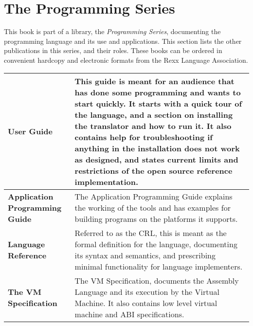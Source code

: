 \chapter{The \crexx{} Programming Series}
This book is part of a library, the \emph{\crexx{} Programming Series}, documenting the \crexx{} programming language and its use and applications. This section lists the other publications in this series, and their roles. These books can be ordered in convenient hardcopy and electronic formats from the Rexx Language Association.
\newline
\newline
\begin{tabularx}{\textwidth}{>{\bfseries}lX}
\toprule
User Guide & This guide is meant for an audience that has done some programming and wants to start quickly. It starts with a quick tour of the language, and a section on installing the \crexx{} translator and how to run it. It also contains help for troubleshooting if anything in the installation does not work as designed, and states current limits and restrictions of the open source reference implementation.
\\\midrule
Application Programming Guide & The Application Programming Guide
explains the working of the tools and has examples for building
programs on the platforms it supports.
\\\midrule
Language Reference & Referred to as the CRL, this is meant as the formal definition for the language, documenting its syntax and semantics, and prescribing minimal functionality for language implementers.
\\\midrule
The \crexx{} VM Specification & The \crexx{} VM
Specification, documents the \crexx{} Assembly Language and its execution
by the \crexx{} Virtual Machine. It also contains low level virtual
machine and ABI specifications.
\\\bottomrule
\end{tabularx}
